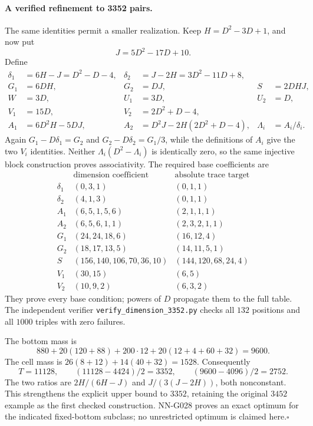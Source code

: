 \paragraph{A verified refinement to 3352 pairs.}
The same identities permit a smaller realization. Keep
$H=D^2-3D+1$, and now put
\[
 J=5D^2-17D+10.
\]
Define
\[
 \begin{aligned}
 \delta_1&=6H-J=D^2-D-4,&
 \delta_2&=J-2H=3D^2-11D+8,\\
 G_1&=6DH,&G_2&=DJ,&S&=2DHJ,\\
 W&=3D,&U_1&=3D,&U_2&=D,\\
 V_1&=15D,&V_2&=2D^2+D-4,\\
 A_1&=6D^2H-5DJ,&
 A_2&=D^2J-2H(2D^2+D-4),&\Lambda_i&=A_i/\delta_i.
 \end{aligned}                                                       \tag{G027.4}
\]
Again $G_1-D\delta_1=G_2$ and
$G_2-D\delta_2=G_1/3$, while the definitions of $A_i$
give the two $V_i$ identities. Neither
$\Lambda_i(D^2-\Lambda_i)$ is identically zero, so the
same injective block construction proves associativity.
The required base coefficients are
\[
\begin{array}{c|l|l}
 &\text{dimension coefficient}&\text{absolute trace target}\\\hline
 \delta_1&(0,3,1)&(0,1,1)\\
 \delta_2&(4,1,3)&(0,1,1)\\
 A_1&(6,5,1,5,6)&(2,1,1,1)\\
 A_2&(6,5,6,1,1)&(2,3,2,1,1)\\
 G_1&(24,24,18,6)&(16,12,4)\\
 G_2&(18,17,13,5)&(14,11,5,1)\\
 S&(156,140,106,70,36,10)&(144,120,68,24,4)\\
 V_1&(30,15)&(6,5)\\
 V_2&(10,9,2)&(6,3,2)
\end{array}                                                         \tag{G027.5}
\]
They prove every base condition; powers of $D$ propagate
them to the full table. The independent verifier
\texttt{verify\_dimension\_3352.py} checks all $132$
positions and all $1000$ triples with zero failures.

The bottom mass is
\[
 880+20(120+88)+200\cdot12+20(12+4+60+32)=9600.
\]
The cell mass is $26(8+12)+14(40+32)=1528$.
Consequently
\[
 T=11128,\qquad
 (11128-4424)/2=3352,\qquad(9600-4096)/2=2752.
 \tag{G027.6}
\]
The two ratios are $2H/(6H-J)$ and
$J/(3(J-2H))$, both nonconstant. This strengthens the
explicit upper bound to $3352$, retaining the original
$3452$ example as the first checked construction.
NN-G028 proves an exact optimum for the indicated
fixed-bottom subclass; no unrestricted optimum is
claimed here.\hfill$\square$

